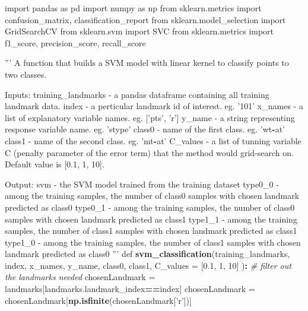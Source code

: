 \documentclass[10pt,letterpaper]{article}
\newenvironment{Shaded}{\begin{snugshade}}{\end{snugshade}}
\newcommand{\KeywordTok}[1]{\textcolor[rgb]{0.13,0.29,0.53}{\textbf{#1}}}
\newcommand{\DataTypeTok}[1]{\textcolor[rgb]{0.13,0.29,0.53}{#1}}
\newcommand{\DecValTok}[1]{\textcolor[rgb]{0.00,0.00,0.81}{#1}}
\newcommand{\FloatTok}[1]{\textcolor[rgb]{0.00,0.00,0.81}{#1}}
\newcommand{\StringTok}[1]{\textcolor[rgb]{0.31,0.60,0.02}{#1}}
\newcommand{\CommentTok}[1]{\textcolor[rgb]{0.56,0.35,0.01}{\textit{#1}}}
\newcommand{\OperatorTok}[1]{\textcolor[rgb]{0.81,0.36,0.00}{\textbf{#1}}}
\newcommand{\NormalTok}[1]{#1}
\begin{document}
\begin{Shaded}
\begin{Highlighting}[]
\NormalTok{import pandas as pd}
\NormalTok{import numpy as np}
\NormalTok{from sklearn.metrics import confusion_matrix, classification_report}
\NormalTok{from sklearn.model_selection import GridSearchCV}
\NormalTok{from sklearn.svm import SVC}
\NormalTok{from sklearn.metrics import f1_score, precision_score, recall_score}

\StringTok{'''}
\StringTok{A function that builds a SVM model with linear kernel to classify points}
\StringTok{to two classes.}

\StringTok{Inputs:}
\StringTok{training_landmarks - a pandas dataframe containing all training landmark}
\StringTok{                     data.}
\StringTok{index              - a perticular landmark id of interest. eg. '}\DecValTok{101}\StringTok{'}
\StringTok{x_names            - a list of explanatory variable names.}
\StringTok{                     eg. ['}\NormalTok{pts}\StringTok{', '}\NormalTok{r}\StringTok{']}
\StringTok{y_name             - a string representing response variable name.}
\StringTok{                     eg. '}\NormalTok{stype}\StringTok{'}
\StringTok{class0             - name of the first class. eg. '}\NormalTok{wt}\OperatorTok{-}\NormalTok{at}\StringTok{'}
\StringTok{class1             - name of the second class. eg. '}\NormalTok{mt}\OperatorTok{-}\NormalTok{at}\StringTok{'}
\StringTok{C_values           - a list of tunning variable C (penalty parameter}
\StringTok{                     of the error term) that the method would grid-search}
\StringTok{                     on. Default value is [0.1, 1, 10].}

\StringTok{Output:}
\StringTok{svm                - the SVM model trained from the training dataset}
\StringTok{type0_0            - among the training samples, the number of class0}
\StringTok{                     samples with chosen landmark predicted as class0}
\StringTok{type0_1            - among the training samples, the number of class0}
\StringTok{                     samples with chosen landmark predicted as class1}
\StringTok{type1_1            - among the training samples, the number of class1}
\StringTok{                     samples with chosen landmark predicted as class1}
\StringTok{type1_0            - among the training samples, the number of class1}
\StringTok{                     samples with chosen landmark predicted as class0}
\StringTok{'''}
\NormalTok{def }\KeywordTok{svm_classification}\NormalTok{(training_landmarks, index, x_names, y_name, class0,}
\NormalTok{        class1, }\DataTypeTok{C_values =}\NormalTok{ [}\FloatTok{0.1}\NormalTok{, }\DecValTok{1}\NormalTok{, }\DecValTok{10}\NormalTok{] )}\OperatorTok{:}
\StringTok{    }\CommentTok{# filter out the landmarks needed}
\StringTok{    }\NormalTok{chosenLandmark =}\StringTok{ }\NormalTok{landmarks[landmarks.landmark_index}\OperatorTok{==}\NormalTok{index]}
\NormalTok{    chosenLandmark =}\StringTok{ }\NormalTok{chosenLandmark[}\KeywordTok{np.isfinite}\NormalTok{(chosenLandmark[}\StringTok{'r'}\NormalTok{])]}
    

\end{Highlighting}
\end{Shaded}
\end{document}
